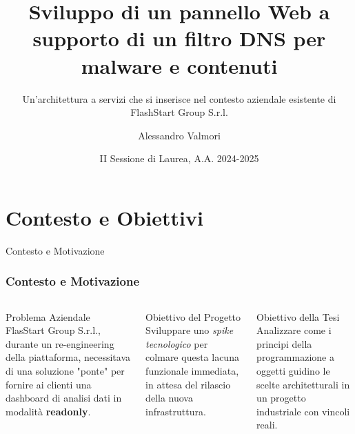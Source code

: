 \documentclass[8pt]{beamer}
\title{Sviluppo di un pannello Web a supporto di un filtro DNS per malware e contenuti}
\subtitle{Un'architettura a servizi che si inserisce nel contesto aziendale esistente di FlashStart Group S.r.l.}
\date{II Sessione di Laurea, A.A. 2024-2025}
\author{Alessandro Valmori}
\institute{Università di Bologna \and Relatore: Prof. Mirko Viroli \and Correlatore: Dott. Nicolas Farabegoli}
\begin{document}
\maketitle



\section{Contesto e Obiettivi}

\begin{frame}{Contesto e Motivazione}
    \frametitle{Contesto e Motivazione}
    
    \begin{columns}[T]
            \begin{block}{Problema Aziendale}
                FlasStart Group S.r.l., durante un re-engineering della piattaforma, necessitava di una soluzione "ponte" per fornire ai clienti una dashboard di analisi dati in modalità \textbf{readonly}.
            \end{block}
            
            \begin{block}{Obiettivo del Progetto}
                Sviluppare uno \textit{spike tecnologico} per colmare questa lacuna funzionale immediata, in attesa del rilascio della nuova infrastruttura.
            \end{block}
            
            \begin{alertblock}{Obiettivo della Tesi}
                Analizzare come i principi della programmazione a oggetti guidino le scelte architetturali in un progetto industriale con vincoli reali.
            \end{alertblock}


\end{columns}
\end{frame}
\end{document}
